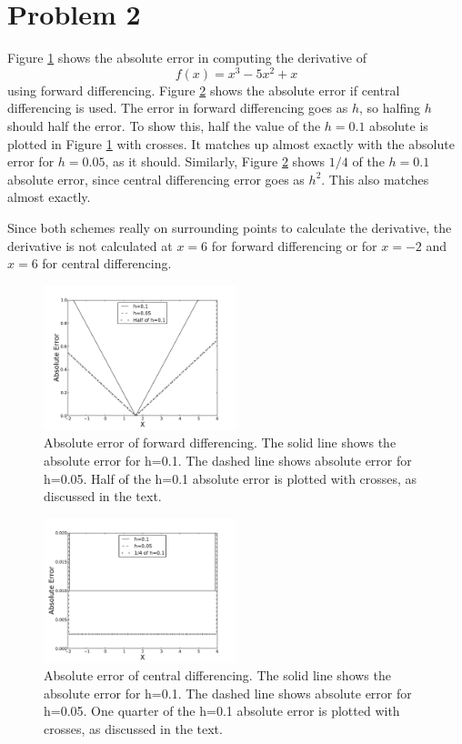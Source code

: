 \documentclass[11pt,letterpaper]{article}
\begin{document}
\section{Problem 2}
Figure \ref{fig:two} shows the absolute error in computing the 
derivative of 
\begin{equation}
f(x)=x^3-5x^2+x
\end{equation}
using forward differencing.  Figure \ref{fig:two2} shows the 
absolute error if central differencing is used.  The error in 
forward differencing goes as $h$, so halfing $h$ should half the error.  
To show this, half the value of the $h=0.1$ absolute is plotted in Figure 
\ref{fig:two} with crosses.  It matches up almost exactly with the 
absolute error for $h=0.05$, as it should.  Similarly, Figure 
\ref{fig:two2} shows $1/4$ of the $h=0.1$ absolute error, since 
central differencing error goes as $h^2$.  This also matches almost 
exactly.

Since both schemes really 
on surrounding points to calculate the derivative, the derivative is 
not calculated at $x=6$ for forward differencing or for $x=-2$ and 
$x=6$ for central differencing.

\begin{figure}
\centering
\includegraphics[width=0.5\textwidth]{twoi.pdf}
\caption{Absolute error of forward differencing.  The solid line shows 
the absolute error for h=0.1.  The dashed line shows absolute error 
for h=0.05.  Half of the h=0.1 absolute error is plotted with crosses, 
as discussed in the text.}
\label{fig:two}
\end{figure} 

\begin{figure}
\centering
\includegraphics[width=0.5\textwidth]{twoii.pdf}
\caption{Absolute error of central differencing.  The solid line shows 
the absolute error for h=0.1.  The dashed line shows absolute error 
for h=0.05.  One quarter of the h=0.1 absolute error is plotted with crosses, 
as discussed in the text.}
\label{fig:two2}
\end{figure} 
\end{document}
